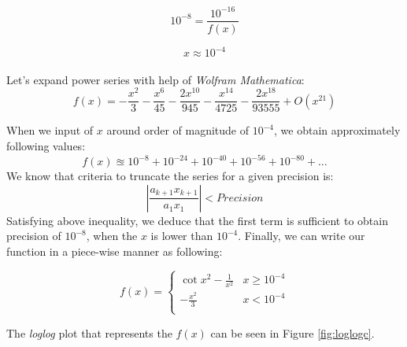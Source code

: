 \documentclass[letterpaper,12pt]{article}
\begin{document}
 \begin{equation*}
    10^{-8}  = \frac{10^{-16}}{f(x)}
 \end{equation*}
 
 \begin{equation*}
    x \approx 10^{-4}
 \end{equation*}
 
 \paragraph{} Let's expand power series with help of \textit{Wolfram Mathematica}:
 \begin{equation*}
    f(x) =-\frac{x^2}{3}-\frac{x^6}{45}-\frac{2 x^{10}}{945}-\frac{x^{14}}{4725}-\frac{2 x^{18}}{93555}+O\left(x^{21}\right)
 \end{equation*}
 
 When we input of $x$ around order of magnitude of $10^{-4}$, we obtain approximately following values:
 \begin{equation*}
    f(x) \approxeq 10^{-8} + 10^{-24} + 10^{-40} + 10^{-56} + 10^{-80} + \dots 
 \end{equation*}
 We know that criteria to truncate the series for a given precision is:
 \begin{equation*}
    \left\lvert \frac{a_{k+1}x_{k+1}}{a_1x_1} \right\rvert < Precision
 \end{equation*}
 Satisfying above inequality, we deduce that the first term is sufficient to obtain precision of $10^{-8}$, when the $x$ is lower than $10^{-4}$. Finally, we can write our function in a piece-wise manner as following:
 
 \[ f(x) = 
 \begin{cases}
   \cot x^2 - \frac{1}{x^2} & x\geq 10^{-4} \\
   -\frac{x^2}{3} &  x < 10^{-4} \\
       
 \end{cases} 
  \]
 
  The \textit{loglog} plot that represents the $f(x)$ can be seen in Figure \ref{fig:loglogc}.
\end{document}
